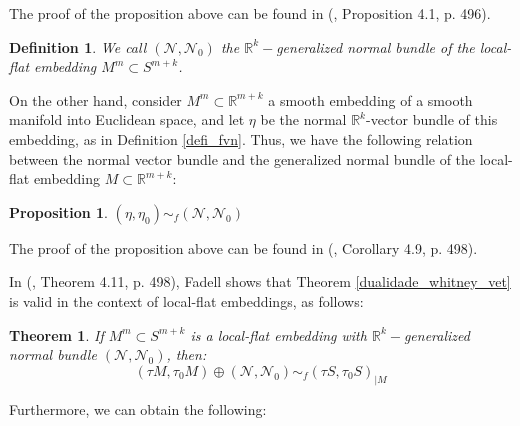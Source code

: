 \documentclass[12pt,oneside]{book}
\newtheorem{defi}   {Definition}[chapter]
\newtheorem{teo}    {Theorem}[chapter]
\newtheorem{prop}   {Proposition}[chapter]
\newcommand{\R}{\mathbb{R}}
\begin{document}
    The proof of the proposition above can be found in (\cite{fadell_1}, Proposition 4.1, p. 496).
    
    \begin{defi}
        We call $(\mathcal{N},\mathcal{N}_{0})$ the $\R^{k}-$generalized normal bundle of the local-flat 
        embedding $M^{m}\subset S^{m+k}$.
    \end{defi}
    
    On the other hand, consider $M^{m}\subset\R^{m+k}$ a smooth embedding of a smooth manifold 
    into Euclidean space, and let $\eta$ be the normal $\R^{k}$-vector bundle of this embedding, as in 
    Definition \ref{defi_fvn}. Thus, we have the following relation between the normal vector bundle and the generalized normal bundle of the 
    local-flat embedding $M\subset \R^{m+k}$:
    
    \begin{prop}
        $(\eta,\eta_{0})\sim_{f} (\mathcal{N},\mathcal{N}_{0})$
    \end{prop}
    
    The proof of the proposition above can be found in (\cite{fadell_1}, Corollary 4.9, p. 498).
    
    In (\cite{fadell_1}, Theorem 4.11, p. 498), Fadell shows that Theorem \ref{dualidade_whitney_vet} is valid in the context of local-flat 
    embeddings, as follows:
    
    \begin{teo}\label{iso_merg_lf_1}
        If $M^{m}\subset S^{m+k}$ is a local-flat embedding with $\R^{k}-$generalized normal bundle $(\mathcal{N},\mathcal{N}_{0})$, then:
        $$ (\tau M,\tau_{0}M)\oplus (\mathcal{N},\mathcal{N}_{0})\sim_{f} (\tau S,\tau_{0}S)_{|M} $$
    \end{teo}
    
    Furthermore, we can obtain the following:
\end{document}
